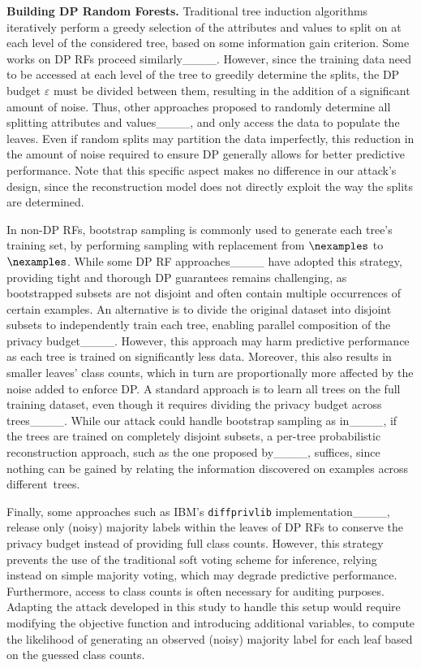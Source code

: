\textbf{Building DP Random Forests.}
Traditional tree induction algorithms iteratively perform a greedy selection of the attributes and values to split on at each level of the considered tree, based on some information gain criterion. 
Some works on DP RFs proceed similarly____. 
However, since the training data need to be accessed at each level of the tree to greedily determine the splits, the DP budget $\varepsilon$ must be divided between them, resulting in the addition of a significant amount of noise. 
Thus, other approaches proposed to randomly determine all splitting attributes and values____, and only access the data to populate the leaves. 
Even if random splits may partition the data imperfectly, this reduction in the amount of noise required to ensure DP generally allows for better predictive performance. 
Note that this specific aspect makes no difference in our attack's design, since the reconstruction model does not directly exploit the way the splits are determined.

In non-DP RFs, bootstrap sampling is commonly used to generate each tree's training set, by performing sampling with replacement from $\nexamples$ to $\nexamples$. 
While some DP RF approaches____ have adopted this strategy, providing tight and thorough DP guarantees remains challenging, as bootstrapped subsets are not disjoint and often contain multiple occurrences of certain examples. An alternative is to divide the original dataset into disjoint subsets to independently train each tree, enabling parallel composition of the privacy budget____. However, this approach may harm predictive performance as each tree is trained on significantly less data. Moreover, this also results in smaller leaves' class counts, which in turn are proportionally more affected by the noise added to enforce DP. 
A standard approach is to learn all trees on the full training dataset, even though it requires dividing the privacy budget across trees____. 
While our attack could handle bootstrap sampling as in____, if the trees are trained on completely disjoint subsets, a per-tree probabilistic reconstruction approach, such as the one proposed by____, suffices, since nothing can be gained by relating the information discovered on examples across different~trees.

Finally, some approaches such as IBM's \texttt{diffprivlib} implementation____, release only (noisy) majority labels within the leaves of DP RFs to conserve the privacy budget instead of providing full class counts. However, this strategy prevents the use of the traditional soft voting scheme for inference, relying instead on simple majority voting, which may degrade predictive performance. Furthermore, access to class counts is often necessary for auditing purposes. Adapting the attack developed in this study to handle this setup would require modifying the objective function and introducing additional variables, to compute the likelihood of generating an observed (noisy) majority label for each leaf based on the guessed class counts.